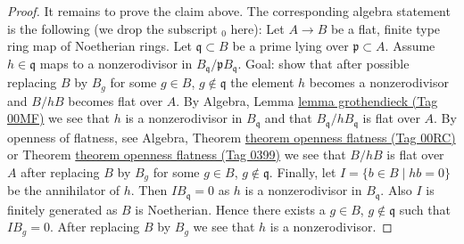 \documentclass{amsart}
\theoremstyle{plain}
\theoremstyle{definition}
\theoremstyle{remark}
\numberwithin{equation}{subsection}
\begin{document}
\begin{proof}
\medskip\noindent
It remains to prove the claim above. The corresponding algebra statement
is the following (we drop the subscript ${}_0$ here):
Let $A \to B$ be a flat, finite type ring map of Noetherian rings.
Let $\mathfrak q \subset B$ be a prime lying over $\mathfrak p \subset A$.
Assume $h \in \mathfrak q$ maps to a nonzerodivisor in
$B_{\mathfrak q}/\mathfrak p B_{\mathfrak q}$.
Goal: show that after possible replacing $B$ by $B_g$ for some
$g \in B$, $g \not \in \mathfrak q$ the element $h$ becomes a nonzerodivisor
and $B/hB$ becomes flat over $A$. By
Algebra, Lemma \href{https://stacks.math.columbia.edu/tag/00MF}{lemma grothendieck (Tag 00MF)}
we see that $h$ is a nonzerodivisor in $B_{\mathfrak q}$ and that
$B_{\mathfrak q}/hB_{\mathfrak q}$ is flat over $A$.
By openness of flatness, see
Algebra, Theorem \href{https://stacks.math.columbia.edu/tag/00RC}{theorem openness flatness (Tag 00RC)}
or
Theorem \href{https://stacks.math.columbia.edu/tag/0399}{theorem openness flatness (Tag 0399)}
we see that $B/hB$ is flat over $A$ after replacing $B$ by $B_g$ for some
$g \in B$, $g \not \in \mathfrak q$. Finally, let
$I = \{b \in B \mid hb = 0\}$ be the annihilator of $h$. Then
$IB_{\mathfrak q} = 0$ as $h$ is a nonzerodivisor in $B_{\mathfrak q}$.
Also $I$ is finitely generated as $B$ is Noetherian.
Hence there exists a $g \in B$, $g \not \in \mathfrak q$ such that $IB_g = 0$.
After replacing $B$ by $B_g$ we see that $h$ is a nonzerodivisor.
\end{proof}
\end{document}
